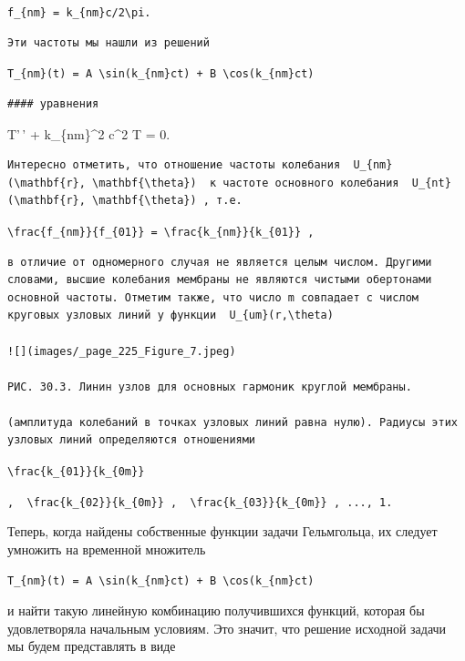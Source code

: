 \documentclass[
  ukrainian,
]{article}
\begin{document}
\texttt{f\_\{nm\}\ =\ k\_\{nm\}c/2\textbackslash{}pi.}

\begin{verbatim}
Эти частоты мы нашли из решений
\end{verbatim}

\texttt{T\_\{nm\}(t)\ =\ A\ \textbackslash{}sin(k\_\{nm\}ct)\ +\ B\ \textbackslash{}cos(k\_\{nm\}ct)}

\begin{verbatim}
#### уравнения
\end{verbatim}

T'\,' + k\_\{nm\}\^{}2 c\^{}2 T = 0.

\begin{verbatim}
Интересно отметить, что отношение частоты колебания  U_{nm}(\mathbf{r}, \mathbf{\theta})  к частоте основного колебания  U_{nt}(\mathbf{r}, \mathbf{\theta}) , т.е.
\end{verbatim}

\texttt{\textbackslash{}frac\{f\_\{nm\}\}\{f\_\{01\}\}\ =\ \textbackslash{}frac\{k\_\{nm\}\}\{k\_\{01\}\}\ ,}

\begin{verbatim}
в отличие от одномерного случая не является целым числом. Другими словами, высшие колебания мембраны не являются чистыми обертонами основной частоты. Отметим также, что число m совпадает с числом круговых узловых линий у функции  U_{um}(r,\theta)

![](images/_page_225_Figure_7.jpeg)

РИС. 30.3. Линин узлов для основных гармоник круглой мембраны.

(амплитуда колебаний в точках узловых линий равна нулю). Радиусы этих узловых линий определяются отношениями
\end{verbatim}

\texttt{\textbackslash{}frac\{k\_\{01\}\}\{k\_\{0m\}\}}

\texttt{,\ \ \textquotesingle{}\textbackslash{}frac\{k\_\{02\}\}\{k\_\{0m\}\}\textquotesingle{}\ ,\ \ \textquotesingle{}\textbackslash{}frac\{k\_\{03\}\}\{k\_\{0m\}\}\textquotesingle{}\ ,\ ...,\ 1.}

Теперь, когда найдены собственные функции задачи Гельмгольца, их следует
умножить на временной множитель

\begin{verbatim}
T_{nm}(t) = A \sin(k_{nm}ct) + B \cos(k_{nm}ct)
\end{verbatim}

и найти такую линейную комбинацию получившихся функций, которая бы
удовлетворяла начальным условиям. Это значит, что решение исходной
задачи мы будем представлять в виде
\end{document}
